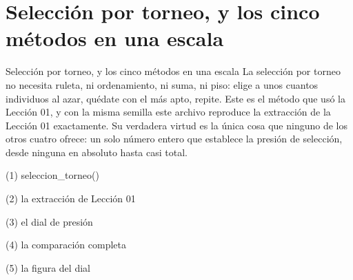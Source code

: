 \section{Selección por torneo, y los cinco métodos en una escala}

\begin{frame}{Selección por torneo, y los cinco métodos en una escala}
La selección por torneo no necesita ruleta, ni ordenamiento, ni suma, ni piso: elige a unos
cuantos individuos al azar, quédate con el más apto, repite. Este es el método que usó
la Lección 01, y con la misma semilla este archivo reproduce la extracción de la Lección 01 exactamente. Su
verdadera virtud es la única cosa que ninguno de los otros cuatro ofrece: un solo número entero que
establece la presión de selección, desde ninguna en absoluto hasta casi total.
\end{frame}

\begin{frame}[fragile]{(1) seleccion\_torneo()}

\end{frame}

\begin{frame}[fragile]{(2) la extracción de Lección 01}

\end{frame}

\begin{frame}[fragile]{(3) el dial de presión}

\end{frame}

\begin{frame}[fragile]{(4) la comparación completa}

\end{frame}

\begin{frame}[fragile]{(5) la figura del dial}

\end{frame}


